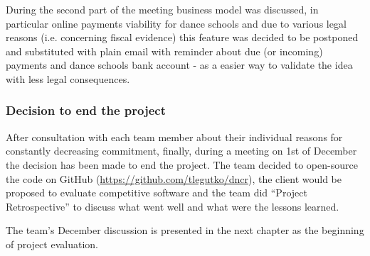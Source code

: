 \documentclass{article}
\begin{document}
During the second part of the meeting business model was discussed, in particular online payments viability for dance schools and due to various legal reasons (i.e. concerning fiscal evidence) this feature was decided to be postponed and substituted with plain email with reminder about due (or incoming) payments and dance schools bank account - as a easier way to validate the idea with less legal consequences.



\subsubsection{Decision to end the project}
After consultation with each team member about their individual reasons for constantly decreasing commitment, finally, during a meeting on 1st of December the decision has been made to end the project. The team decided to open-source the code on GitHub (\url{https://github.com/tlegutko/dncr}), the client would be proposed to evaluate competitive software and the team did ``Project Retrospective'' to discuss what went well and what were the lessons learned.

The team's December discussion is presented in the next chapter as the beginning of project evaluation.

\newpage
\end{document}
